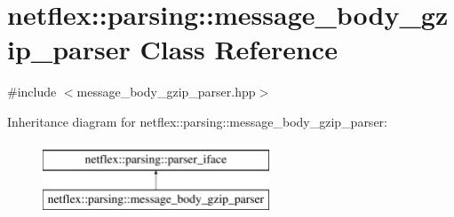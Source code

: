 \hypertarget{classnetflex_1_1parsing_1_1message__body__gzip__parser}{}\section{netflex\+:\+:parsing\+:\+:message\+\_\+body\+\_\+gzip\+\_\+parser Class Reference}
\label{classnetflex_1_1parsing_1_1message__body__gzip__parser}


{\ttfamily \#include $<$message\+\_\+body\+\_\+gzip\+\_\+parser.\+hpp$>$}

Inheritance diagram for netflex\+:\+:parsing\+:\+:message\+\_\+body\+\_\+gzip\+\_\+parser\+:\begin{figure}[H]
\begin{center}
\leavevmode
\includegraphics[height=2.000000cm]{classnetflex_1_1parsing_1_1message__body__gzip__parser}
\end{center}
\end{figure}
